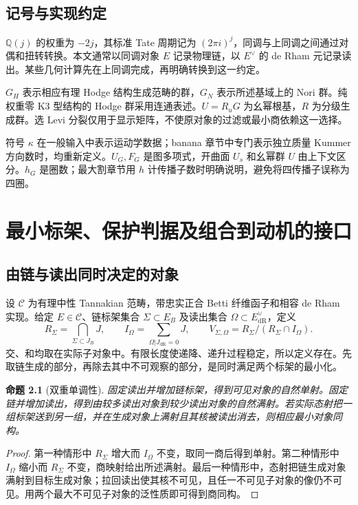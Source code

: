 \documentclass[11pt,a4paper,oneside]{ctexrep}
\theoremstyle{cnplain}
\newtheorem{proposition}[theorem]{命题}
\theoremstyle{definition}
\theoremstyle{remark}
\newcommand{\Q}{\mathbb Q}
\newcommand{\dR}{\mathrm{dR}}
\begin{document}
\section{记号与实现约定}\label{sec:notation}
$\Q(j)$ 的权重为 $-2j$，其标准 Tate 周期记为 $(2\pi i)^j$，同调与上同调之间通过对偶和扭转转换。本文通常以同调对象 $E$ 记录物理链，以 $E^\vee$ 的 de Rham 元记录读出。某些几何计算先在上同调完成，再明确转换到这一约定。

$G_H$ 表示相应有理 Hodge 结构生成范畴的群，$G_N$ 表示所述基域上的 Nori 群。纯权重零 K3 型结构的 Hodge 群采用连通表述。$U=R_uG$ 为幺幂根基，$R$ 为分级生成群。选 Levi 分裂仅用于显示矩阵，不使原对象的过滤或最小商依赖这一选择。

符号 $\kappa$ 在一般输入中表示运动学数据；banana 章节中专门表示独立质量 Kummer 方向数时，均重新定义。$U_G,F_G$ 是图多项式，开曲面 $U_s$ 和幺幂群 $U$ 由上下文区分。$h_G$ 是圈数；最大割章节用 $h$ 计传播子数时明确说明，避免将四传播子误称为四圈。

\chapter{最小标架、保护判据及组合到动机的接口}\label{ch:frames}
\section{由链与读出同时决定的对象}
设 $\mathcal C$ 为有理中性 Tannakian 范畴，带忠实正合 Betti 纤维函子和相容 de Rham 实现。给定 $E\in\mathcal C$、链标架集合 $\Sigma\subset E_B$ 及读出集合 $\Omega\subset E_{\dR}^{\vee}$，定义
\begin{equation}\label{eq:visible}
 R_\Sigma=\bigcap_{\Sigma\subset J_B}J,\qquad
 I_\Omega=\sum_{\Omega|J_{\dR}=0}J,\qquad
 V_{\Sigma,\Omega}=R_\Sigma/(R_\Sigma\cap I_\Omega).
\end{equation}
交、和均取在实际子对象中。有限长度使递降、递升过程稳定，所以定义存在。先取链生成的部分，再除去其中不可观察的部分，是同时满足两个标架的最小化。

\begin{proposition}[双重单调性]\label{prop:visible}
固定读出并增加链标架，得到可见对象的自然单射。固定链并增加读出，得到由较多读出对象到较少读出对象的自然满射。若实际态射把一组标架送到另一组，并在生成对象上满射且其核被读出消去，则相应最小对象同构。
\end{proposition}
\begin{proof}
第一种情形中 $R_\Sigma$ 增大而 $I_\Omega$ 不变，取同一商后得到单射。第二种情形中 $I_\Omega$ 缩小而 $R_\Sigma$ 不变，商映射给出所述满射。最后一种情形中，态射把链生成对象满射到目标生成对象；拉回读出使其核不可见，且任一不可见子对象的像仍不可见。用两个最大不可见子对象的泛性质即可得到商同构。
\end{proof}
\end{document}
